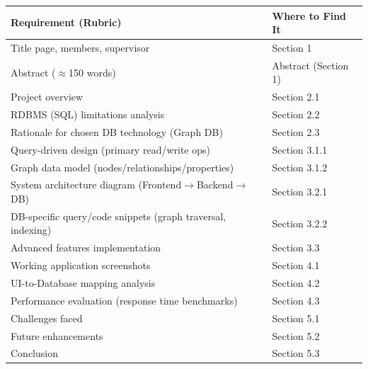 \begin{table}[h]
\centering
\begin{tabular}{|p{7.2cm}|p{6.0cm}|}
\hline
\textbf{Requirement (Rubric)} & \textbf{Where to Find It} \\
\hline
Title page, members, supervisor & Section 1 \\
\hline
Abstract ($\approx$150 words) & Abstract (Section 1) \\
\hline
Project overview & Section 2.1 \\
\hline
RDBMS (SQL) limitations analysis & Section 2.2 \\
\hline
Rationale for chosen DB technology (Graph DB) & Section 2.3 \\
\hline
Query-driven design (primary read/write ops) & Section 3.1.1 \\
\hline
Graph data model (nodes/relationships/properties) & Section 3.1.2 \\
\hline
System architecture diagram (Frontend$\rightarrow$Backend$\rightarrow$DB) & Section 3.2.1 \\
\hline
DB-specific query/code snippets (graph traversal, indexing) & Section 3.2.2 \\
\hline
Advanced features implementation & Section 3.3 \\
\hline
Working application screenshots & Section 4.1 \\
\hline
UI-to-Database mapping analysis & Section 4.2 \\
\hline
Performance evaluation (response time benchmarks) & Section 4.3 \\
\hline
Challenges faced & Section 5.1 \\
\hline
Future enhancements & Section 5.2 \\
\hline
Conclusion & Section 5.3 \\
\hline
\end{tabular}
\end{table}

\newpage
\tableofcontents
\newpage